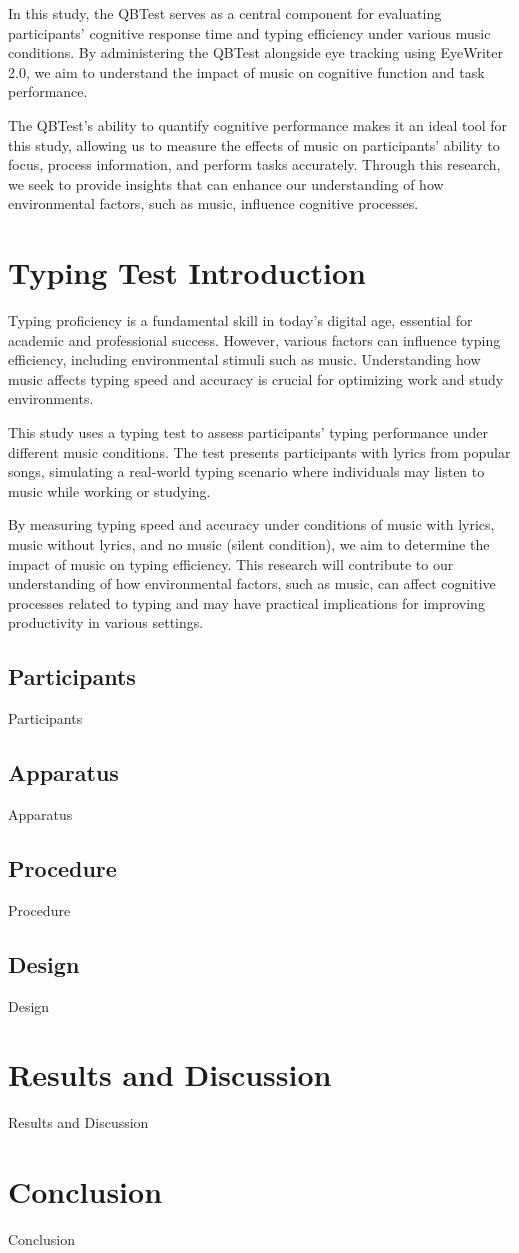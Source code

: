 \documentclass[manuscript, screen, review]{acmart} %
\begin{document}
In this study, the QBTest serves as a central component for evaluating participants' cognitive response time and typing efficiency under various music conditions. By administering the QBTest alongside eye tracking using EyeWriter 2.0, we aim to understand the impact of music on cognitive function and task performance.

The QBTest's ability to quantify cognitive performance makes it an ideal tool for this study, allowing us to measure the effects of music on participants' ability to focus, process information, and perform tasks accurately. Through this research, we seek to provide insights that can enhance our understanding of how environmental factors, such as music, influence cognitive processes.

\section{Typing Test Introduction}
Typing proficiency is a fundamental skill in today's digital age, essential for academic and professional success. However, various factors can influence typing efficiency, including environmental stimuli such as music. Understanding how music affects typing speed and accuracy is crucial for optimizing work and study environments.

This study uses a typing test to assess participants' typing performance under different music conditions. The test presents participants with lyrics from popular songs, simulating a real-world typing scenario where individuals may listen to music while working or studying.

By measuring typing speed and accuracy under conditions of music with lyrics, music without lyrics, and no music (silent condition), we aim to determine the impact of music on typing efficiency. This research will contribute to our understanding of how environmental factors, such as music, can affect cognitive processes related to typing and may have practical implications for improving productivity in various settings.


\subsection[short]{Participants}
Participants

\subsection[short]{Apparatus}
Apparatus

\subsection[short]{Procedure}
Procedure

\subsection[short]{Design}
Design

\section{Results and Discussion}
Results and Discussion

\section{Conclusion}
Conclusion




\end{document}
